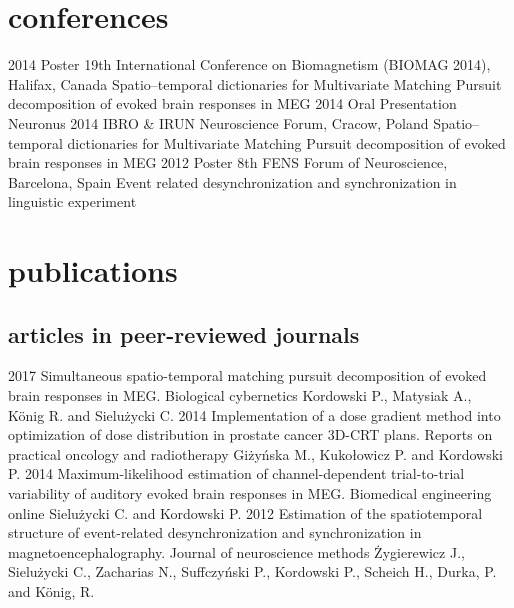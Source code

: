 \documentclass[]{friggeri-cv}
\begin{document}
\section{conferences}

\begin{entrylist}
  \entry
    {2014}
    {Poster}
    {19th International Conference on Biomagnetism (BIOMAG 2014), Halifax, Canada}
    {Spatio--temporal dictionaries for Multivariate Matching Pursuit decomposition of evoked brain responses in MEG}
  \entry
    {2014}
    {Oral Presentation}
    {Neuronus 2014 IBRO \& IRUN Neuroscience Forum, Cracow, Poland}
    {Spatio--temporal dictionaries for Multivariate Matching Pursuit decomposition of evoked brain responses in MEG}
  \entry
    {2012}
    {Poster}
    {8th FENS Forum of Neuroscience, Barcelona, Spain}
    {Event related desynchronization and synchronization in linguistic experiment}
\end{entrylist}

\section{publications}
\subsection{articles in peer-reviewed journals}
\begin{entrylist}
  \entry
    {2017}
    {Simultaneous spatio-temporal matching pursuit decomposition of evoked brain responses in MEG.}
    {Biological cybernetics}
    {Kordowski P., Matysiak A., K\"onig R. and Sielu\.zycki C.}
  \entry
    {2014}
    {Implementation of a dose gradient method into optimization of dose distribution in prostate cancer 3D-CRT plans.}
    {Reports on practical oncology and radiotherapy}
    {Gi\.zy\'nska M., Kuko\l{}owicz P. and Kordowski P.}
  \entry
    {2014}
    {Maximum-likelihood estimation of channel-dependent trial-to-trial variability of auditory evoked brain responses in MEG.}
    {Biomedical engineering online}
    {Sielu\.zycki C. and Kordowski P.}  
    \entry
    {2012}
    {Estimation of the spatiotemporal structure of event-related desynchronization and synchronization in magnetoencephalography.}
    {Journal of neuroscience methods}
    {\.Zygierewicz J., Sielu\.zycki C., Zacharias N., Suffczy\'nski P., Kordowski P., Scheich H., Durka, P. and K\"onig, R.}
\end{entrylist}

\newpage
\end{document}
